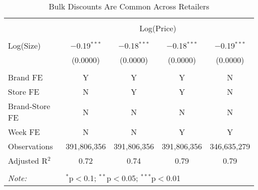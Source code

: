 
\begin{table}[!htbp] \centering
  \caption{Bulk Discounts Are Common Across Retailers}
  \label{tab:bulkDiscountScanner}
\begin{tabular}{@{\extracolsep{5pt}}lcccc}
\\[-1.8ex]\hline
\hline \\[-1.8ex]
 & \multicolumn{4}{c}{Log(Price)} \\
\cline{2-5}
\hline \\[-1.8ex]
Log(Size)       & $-$0.19$^{***}$ & $-$0.18$^{***}$ & $-$0.18$^{***}$ & $-$0.19$^{***}$ \\
                 & (0.0000)        & (0.0000)        & (0.0000)        & (0.0000)        \\
 \hline \\[-1.8ex]
Brand FE         & Y                 & Y               & Y            & N \\
Store FE         & N                 & Y               & Y            & N\\
Brand-Store FE   & N                 & N               & N            & N \\
Week FE          & N                 & N               & Y            & Y \\
Observations     & 391,806,356       & 391,806,356     & 391,806,356  & 346,635,279 \\
Adjusted R$^{2}$ & 0.72              & 0.74            & 0.79         & 0.79 \\
\hline
\hline \\[-1.8ex]
\textit{Note:}  & \multicolumn{4}{l}{$^{*}$p$<$0.1; $^{**}$p$<$0.05; $^{***}$p$<$0.01} \\
\end{tabular}
\end{table}
